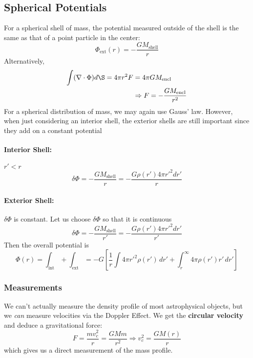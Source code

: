 \documentclass[10pt]{article}
\begin{document}
	\subsection{Spherical Potentials}
	For a spherical shell of mass, the potential measured outside of the shell is the same as that of a point particle in the center:
	\begin{equation}\label{shellpot1} \Phi_{\mathrm{ext}}(r) = -\frac{GM_{\mathrm{shell}}}{r}\end{equation}
	Alternatively,
	\begin{align}
		\int (\nabla\cdot\Phi)d\S = 4\pi r^2 F &= 4\pi G M_{\mathrm{encl}}\nonumber\\
		&\Rightarrow F=-\frac{GM_{\mathrm{encl}}}{r^2}\label{shellpot2}
	\end{align}
	For a spherical distribution of mass, we may again use Gauss' law. However, when just considering an interior shell, the exterior shells are still important since they add on a constant potential
	\paragraph{Interior Shell:} $r'<r$
	$$\delta \Phi = -\frac{GM_{\mathrm{shell}}}{r}=-\frac{G\rho(r')4\pi{r'}^2dr'}{r}$$
	\paragraph{Exterior Shell:} $\delta \Phi$ is constant. Let us choose $\delta\Phi$ so that it is continuous
	$$\delta\Phi = -\frac{GM_{\mathrm{shell}}}{r'}=-\frac{G\rho(r') 4\pi {r'}^2dr'}{r'}$$
	Then the overall potential is
	\begin{equation} \label{potential1} \Phi(r)=\int_{\mathrm{int}}+\int_{\mathrm{ext}} = -G\left[\frac{1}{r}\int 4\pi{r'}^2 \rho(r')\,dr'+\int _r^\infty 4\pi \rho(r')r'\,dr'\right]\end{equation}
	\subsubsection{Measurements}
	We can't actually measure the density profile of most astrophysical objects, but we \emph{can} measure velocities via the Doppler Effect. We get the \textbf{circular velocity} and deduce a gravitational force:
	\begin{equation}\label{circular}F=\frac{mv_c^2}{r}=\frac{GMm}{r^2}\Rightarrow v_c^2=\frac{GM(r)}{r}\end{equation}
	which gives us a direct measurement of the mass profile.\\
	
\end{document}
